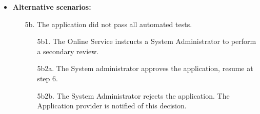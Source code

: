 \documentclass[english]{sareport}
\begin{document}
\begin{itemize}
    \item \textbf{Alternative scenarios:} 
    \begin{enumerate}
        \item [5b.] The application did not pass all automated tests.
	\begin{enumerate}
		\item [5b1.] The Online Service instructs a System Administrator to perform a secondary review.
		\item [5b2a.] The System administrator approves the application, resume at step 6.
		\item [5b2b.] The System Administrator rejects the application. The Application provider is notified of this decision.
	\end{enumerate}
    \end{enumerate}
\end{itemize}
\end{document}
